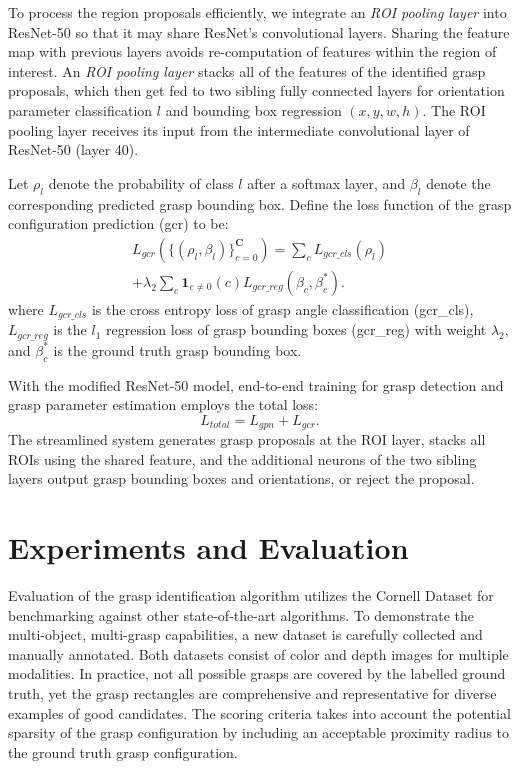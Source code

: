\documentclass[letterpaper, 10 pt, journal, twoside]{IEEEtran}
\begin{document}
To process the region proposals efficiently, we integrate an
\emph{ROI pooling layer} \cite{girshick2015fast} into ResNet-50 so that it
may share ResNet's convolutional layers.  Sharing the feature map with
previous layers avoids re-computation of features within the region of
interest. An \emph{ROI pooling layer} stacks all of the features of the
identified grasp proposals, which then get fed to two sibling fully
connected layers for orientation parameter classification $l$ and bounding
box regression $(x,y,w,h)$. The ROI pooling layer receives its input from
the intermediate convolutional layer of ResNet-50 (layer 40). 

Let $\rho_l$ denote the probability of class $l$ after a softmax layer, and
$\beta_l$
denote the corresponding predicted grasp bounding box. Define the loss
function of the grasp configuration prediction (gcr) to be:
\begin{multline}
  L_{gcr}(\{(\rho_l, \beta_l)\}_{c=0}^\mathbf{C}) 
    = \sum_c L_{gcr\_cls}(\rho_l) \\ 
      + \lambda_2 \sum_c \mathbf{1}_{c\neq 0}(c) L_{gcr\_reg}(\beta_c,
      \beta_c^\ast). 
\end{multline}
where $L_{gcr\_cls}$ is the cross entropy loss of grasp angle classification
(gcr\_cls), $L_{gcr\_reg}$ is the $l_1$ regression loss of grasp bounding boxes (gcr\_reg) with weight $\lambda_2$, and $\beta_c^{\ast}$ is the ground truth grasp bounding box.


With the modified ResNet-50 model, end-to-end training for grasp detection
and grasp parameter estimation employs the total loss: 
\begin{equation}
  L_{total} = L_{gpn} + L_{gcr}.  \end{equation}
The streamlined system generates grasp proposals at the ROI layer,
stacks all ROIs using the shared feature, and the additional neurons of the
two sibling layers output grasp bounding boxes and orientations, or reject
the proposal. 
 
\section{Experiments and Evaluation}










Evaluation of the grasp identification algorithm utilizes the Cornell
Dataset for benchmarking against other state-of-the-art algorithms. To demonstrate
the multi-object, multi-grasp capabilities, a new dataset is carefully collected and manually annotated.
Both datasets consist of color and depth images for multiple
modalities. In practice, not all possible grasps are covered by the labelled
ground truth, yet the grasp rectangles are comprehensive and representative for
diverse examples of good candidates. The scoring criteria takes into
account the potential sparsity of the grasp configuration by including an
acceptable proximity radius to the ground truth grasp configuration.
\end{document}
